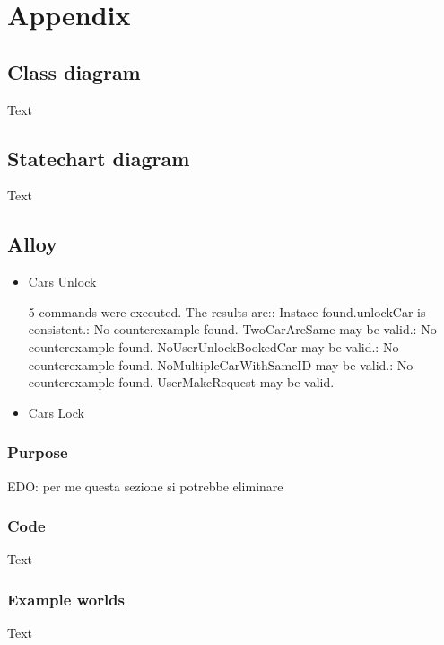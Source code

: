 \section{Appendix}
\subsection{Class diagram}
Text

\newpage
\subsection{Statechart diagram}
Text

\newpage
\subsection{Alloy}
\begin{itemize}
\item Cars Unlock 



5 commands were executed. The results are:: Instace found.unlockCar is consistent.: No counterexample found. TwoCarAreSame may be valid.: No counterexample found. NoUserUnlockBookedCar may be valid.: No counterexample found. NoMultipleCarWithSameID may be valid.: No counterexample found. UserMakeRequest may be valid.
   
\newpage

\item  Cars Lock
   
   
\end{itemize}   

\newpage
\subsubsection{Purpose}
EDO: per me questa sezione si potrebbe eliminare

\newpage
\subsubsection{Code}
Text

\newpage
\subsubsection{Example worlds}
Text
